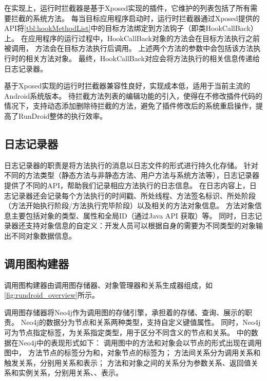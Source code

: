 在实现上，运行时拦截器是基于Xposed\cite{Xposed}实现的插件，它维护的列表包括了所有需要拦截的系统方法。%
每当目标应用程序启动时，运行时拦截器通过Xposed提供的API将\autoref{tbl:hookMethodList}中的目标方法绑定到方法钩子（即类HookCallBack）上。
在应用程序的运行过程中，HookCallBack对象的方法会在目标方法执行之前被调用，
方法会在目标方法执行后调用。
上述两个方法的参数中会包括该方法执行时的相关方法对象。
最终，HookCallBack对应会将方法执行的相关信息传递给日志记录器。



基于Xposed实现的运行时拦截器兼容性良好，实现成本低，适用于当前主流的Android系统版本。
待拦截方法列表的编辑功能的引入，使得在不修改插件代码的情况下，支持动态添加删除待拦截的方法，避免了插件修改后的系统重启操作，提高了RunDroid整体的执行效率。
 

\subsection{日志记录器}

日志记录器的职责是将方法执行的消息以日志文件的形式进行持久化存储。
针对不同的方法类型（静态方法与非静态方法、用户方法与系统方法等），日志记录器提供了不同的API，帮助我们记录相应方法执行的日志信息。
在日志内容上，日志记录器还会记录每个方法执行的时间戳、所处线程、方法签名标识、所处阶段（方法开始执行阶段/方法执行完毕阶段）以及相关的方法对象信息。
方法对象信息主要包括对象的类型、属性和全局ID（通过Java API  获取）等。
同时，日志记录器还支持对象信息的自定义：开发人员可以根据自身的需要为不同类型的对象输出不同对象数据信息。




\subsection{调用图构建器}

调用图构建器由调用图存储器、对象管理器和关系生成器组成，如\autoref{fig:rundroid_overview}所示。

调用图存储器将Neo4j\cite{Neo4jthe19}作为调用图的存储引擎，承担着\ecg 的存储、查询、展示的职责。
Neo4j的数据分为节点和关系两种类型，支持自定义键值属性。
同时，Neo4j可为节点指定标签，为关系指定类型，用于区分不同含义的节点和关系。
\ecg 中的数据在Neo4j中的表现形式如下：
调用图中的方法和对象会以节点的形式出现在调用图中， 方法节点的标签分为和，对象节点的标签为；
方法间关系分为调用关系和触发关系，分别用关系和表示；
方法和对象之间的关系分为参数关系、返回值关系和实例关系，分别用关系、、表示。




